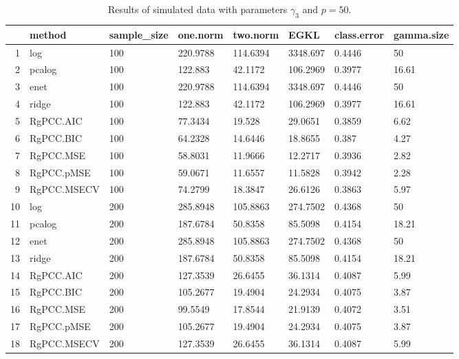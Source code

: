 \begin{table}[ht]
\centering
\begin{tabular}{rlllllll}
  \hline
 & method & sample\_size & one.norm & two.norm & EGKL & class.error & gamma.size \\ 
  \hline
1 & log & 100 & 220.9788 & 114.6394 & 3348.697 & 0.4446 & 50 \\ 
  2 & pcalog & 100 & 122.883 & 42.1172 & 106.2969 & 0.3977 & 16.61 \\ 
  3 & enet & 100 & 220.9788 & 114.6394 & 3348.697 & 0.4446 & 50 \\ 
  4 & ridge & 100 & 122.883 & 42.1172 & 106.2969 & 0.3977 & 16.61 \\ 
  5 & RgPCC.AIC & 100 & 77.3434 & 19.528 & 29.0651 & 0.3859 & 6.62 \\ 
  6 & RgPCC.BIC & 100 & 64.2328 & 14.6446 & 18.8655 & 0.387 & 4.27 \\ 
  7 & RgPCC.MSE & 100 & 58.8031 & 11.9666 & 12.2717 & 0.3936 & 2.82 \\ 
  8 & RgPCC.pMSE & 100 & 59.0671 & 11.6557 & 11.5828 & 0.3942 & 2.28 \\ 
  9 & RgPCC.MSECV & 100 & 74.2799 & 18.3847 & 26.6126 & 0.3863 & 5.97 \\ 
  10 & log & 200 & 285.8948 & 105.8863 & 274.7502 & 0.4368 & 50 \\ 
  11 & pcalog & 200 & 187.6784 & 50.8358 & 85.5098 & 0.4154 & 18.21 \\ 
  12 & enet & 200 & 285.8948 & 105.8863 & 274.7502 & 0.4368 & 50 \\ 
  13 & ridge & 200 & 187.6784 & 50.8358 & 85.5098 & 0.4154 & 18.21 \\ 
  14 & RgPCC.AIC & 200 & 127.3539 & 26.6455 & 36.1314 & 0.4087 & 5.99 \\ 
  15 & RgPCC.BIC & 200 & 105.2677 & 19.4904 & 24.2934 & 0.4075 & 3.87 \\ 
  16 & RgPCC.MSE & 200 & 99.5549 & 17.8544 & 21.9139 & 0.4072 & 3.51 \\ 
  17 & RgPCC.pMSE & 200 & 105.2677 & 19.4904 & 24.2934 & 0.4075 & 3.87 \\ 
  18 & RgPCC.MSECV & 200 & 127.3539 & 26.6455 & 36.1314 & 0.4087 & 5.99 \\ 
   \hline
\end{tabular}
\caption{Results of simulated data with parameters $\gamma_3$ and $p =50$. } 
\label{fig-3-leadnew-50-metrics-p}
\end{table}
